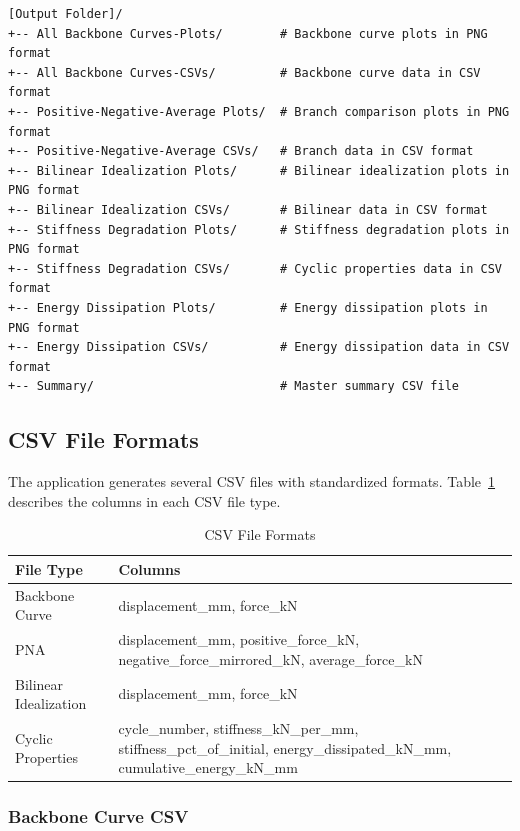 \documentclass[11pt,a4paper]{article}
\begin{document}
\begin{lstlisting}
[Output Folder]/
+-- All Backbone Curves-Plots/        # Backbone curve plots in PNG format
+-- All Backbone Curves-CSVs/         # Backbone curve data in CSV format
+-- Positive-Negative-Average Plots/  # Branch comparison plots in PNG format
+-- Positive-Negative-Average CSVs/   # Branch data in CSV format
+-- Bilinear Idealization Plots/      # Bilinear idealization plots in PNG format
+-- Bilinear Idealization CSVs/       # Bilinear data in CSV format
+-- Stiffness Degradation Plots/      # Stiffness degradation plots in PNG format
+-- Stiffness Degradation CSVs/       # Cyclic properties data in CSV format
+-- Energy Dissipation Plots/         # Energy dissipation plots in PNG format
+-- Energy Dissipation CSVs/          # Energy dissipation data in CSV format
+-- Summary/                          # Master summary CSV file
\end{lstlisting}

\subsection{CSV File Formats}

The application generates several CSV files with standardized formats. Table~\ref{tab:csv_formats} describes the columns in each CSV file type.

\begin{table}[h]
\centering
\caption{CSV File Formats}\label{tab:csv_formats}
\begin{tabular}{p{4cm}p{10cm}}
\toprule
\textbf{File Type} & \textbf{Columns} \\
\midrule
Backbone Curve & displacement\_mm, force\_kN \\
PNA & displacement\_mm, positive\_force\_kN, negative\_force\_mirrored\_kN, average\_force\_kN \\
Bilinear Idealization & displacement\_mm, force\_kN \\
Cyclic Properties & cycle\_number, stiffness\_kN\_per\_mm, stiffness\_pct\_of\_initial, energy\_dissipated\_kN\_mm, cumulative\_energy\_kN\_mm \\
\bottomrule
\end{tabular}
\end{table}

\subsubsection{Backbone Curve CSV}
\end{document}
